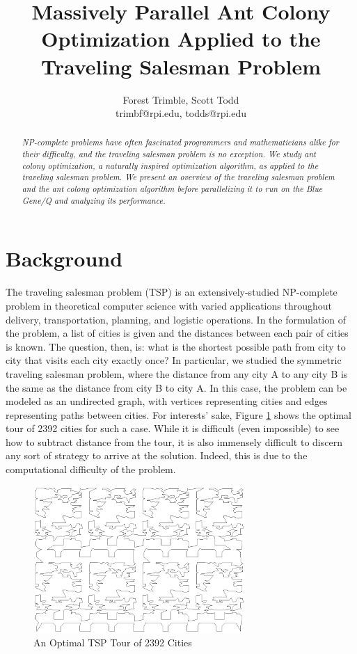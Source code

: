 \documentclass[twocolumn]{article}
\title{Massively Parallel Ant Colony Optimization Applied to the Traveling Salesman Problem}
\author{Forest Trimble, Scott Todd\\trimbf@rpi.edu, todds@rpi.edu}
\begin{document}
\maketitle

\pagestyle{fancy}
\fancyhead{}
\fancyhead[R]{\today}


\begin{abstract}
  \emph{NP-complete problems have often fascinated programmers and mathematicians alike
  for their difficulty, and the traveling salesman problem is no exception. We 
  study ant colony optimization, a naturally inspired optimization algorithm,
  as applied to the traveling salesman problem. We present an overview of
  the traveling salesman problem and the ant colony optimization algorithm before
  parallelizing it to run on the Blue Gene/Q and analyzing its performance. }
\end{abstract}

\section{Background} \label{sec:tsp}

The traveling salesman problem (TSP) is an extensively-studied NP-complete problem 
in theoretical computer science with varied applications throughout delivery, 
transportation, planning, and logistic operations. In the formulation of the 
problem, a list of cities is given and the distances between each pair of cities
is known. The question, then, is: what is the shortest possible path from city to
city that visits each city exactly once? In particular, we studied the symmetric
traveling salesman problem, where the distance from any city A to any city B
is the same as the distance from city B to city A. In this case, the problem
can be modeled as an undirected graph, with vertices representing cities and
edges representing paths between cities. For interests' sake, Figure \ref{fig:opt2392}
shows the optimal tour of 2392 cities for such a case. While it is difficult 
(even impossible) to see how to subtract distance from the tour, it is also 
immensely difficult to discern any sort of strategy to arrive at the solution. 
Indeed, this is due to the computational difficulty of the problem.

\begin{figure}
  \centering
  \includegraphics[height=2.2in]{plots/pr2392.eps}
  \caption{An Optimal TSP Tour of 2392 Cities} \label{fig:opt2392}
\end{figure}
\end{document}
